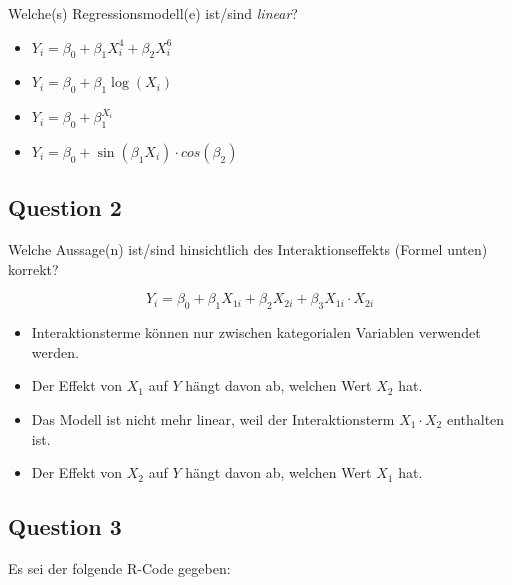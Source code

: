 \documentclass[
]{book}
\providecommand{\tightlist}{%
  \setlength{\itemsep}{0pt}\setlength{\parskip}{0pt}}
\begin{document}
Welche(s) Regressionsmodell(e) ist/sind \emph{linear}?

\begin{itemize}
\item
  \(Y_i = \beta_0 + \beta_1 X_i^4 + \beta_2 X_i^6\)
\item
  \(Y_i = \beta_0 + \beta_1 \log(X_i)\)
\item
  \(Y_i = \beta_0 + \beta_1^{X_i}\)
\item
  \(Y_i = \beta_0 + \sin(\beta_1 X_i) \cdot cos(\beta_2)\)
\end{itemize}

\subsection{Question 2}\label{question-2-2}

Welche Aussage(n) ist/sind hinsichtlich des Interaktionseffekts (Formel unten)
korrekt?

\[Y_i = \beta_0 + \beta_1 X_{1i} + \beta_2 X_{2i} + \beta_3 X_{1i} \cdot X_{2i}\]

\begin{itemize}
\tightlist
\item
  Interaktionsterme können nur zwischen kategorialen Variablen verwendet werden.
\item
  Der Effekt von \(X_1\) auf \(Y\) hängt davon ab, welchen Wert \(X_2\) hat.
\item
  Das Modell ist nicht mehr linear, weil der Interaktionsterm \(X_1 \cdot X_2\) enthalten ist.
\item
  Der Effekt von \(X_2\) auf \(Y\) hängt davon ab, welchen Wert \(X_1\) hat.
\end{itemize}

\subsection{Question 3}\label{question-3-2}

Es sei der folgende R-Code gegeben:
\end{document}
